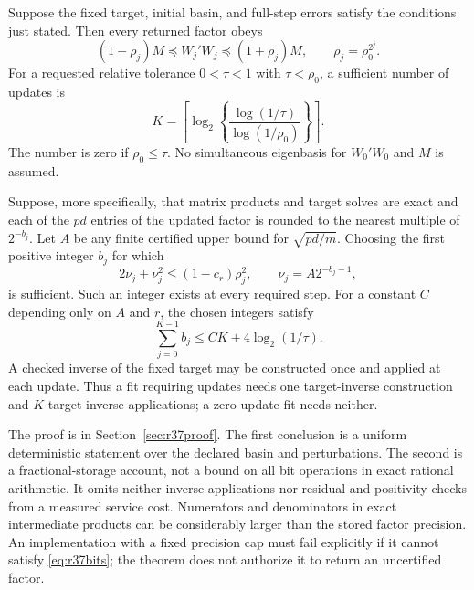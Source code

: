 \begin{theorem}\label{thm:r37precision}
Suppose the fixed target, initial basin, and full-step errors satisfy the
conditions just stated. Then every returned factor obeys
\begin{equation}\label{eq:r37double}
 (1-\rho_j)M\preceq W_j'W_j\preceq(1+\rho_j)M,
 \qquad \rho_j=\rho_0^{2^j}.
\end{equation}
For a requested relative tolerance $0<\tau<1$ with $\tau<\rho_0$, a sufficient number of updates is
\begin{equation}\label{eq:r37cap}
 K=\left\lceil\log_2\left\{
       \frac{\log(1/\tau)}{\log(1/\rho_0)}\right\}\right\rceil.
\end{equation}
The number is zero if $\rho_0\leq\tau$. No simultaneous eigenbasis for
$W_0'W_0$ and $M$ is assumed.

Suppose, more specifically, that matrix products and target solves are exact
and each of the $pd$ entries of the updated factor is rounded to the nearest
multiple of $2^{-b_j}$. Let $A$ be any finite certified upper bound for
$\sqrt{pd/m}$. Choosing the first positive integer $b_j$ for which
\begin{equation}\label{eq:r37bits}
 2\nu_j+\nu_j^2\leq(1-c_r)\rho_j^2,
 \qquad \nu_j=A2^{-b_j-1},
\end{equation}
is sufficient. Such an integer exists at every required step. For a constant
$C$ depending only on $A$ and $r$, the chosen integers satisfy
\begin{equation}\label{eq:r37bitaccount}
 \sum_{j=0}^{K-1}b_j\leq CK+4\log_2(1/\tau).
\end{equation}
A checked inverse of the fixed target may be constructed once and applied
at each update. Thus a fit requiring updates needs one target-inverse
construction and $K$ target-inverse applications; a zero-update fit needs
neither.
\end{theorem}

The proof is in Section~\ref{sec:r37proof}. The first conclusion is a
uniform deterministic statement over the declared basin and perturbations.
The second is a fractional-storage account, not a bound on all bit operations
in exact rational arithmetic. It omits neither inverse applications nor
residual and positivity checks from a measured service cost. Numerators and
denominators in exact intermediate products can be considerably larger than
the stored factor precision. An implementation with a fixed precision cap
must fail explicitly if it cannot satisfy \eqref{eq:r37bits}; the theorem
does not authorize it to return an uncertified factor.

